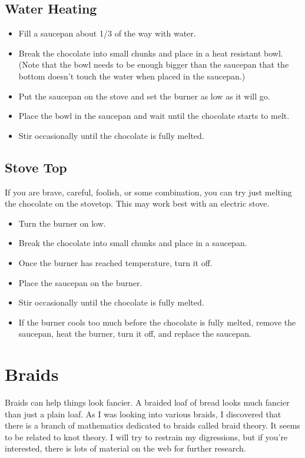 \documentclass[10pt, openany]{book}
\begin{document}
\subsection{Water Heating}
\begin{itemize}
  \item Fill a saucepan about 1/3 of the way with water.
  \item Break the chocolate into small chunks and place in a heat resistant bowl.  (Note that the bowl needs to be enough bigger than the saucepan that the bottom doesn't touch the water when placed in the saucepan.)
  \item Put the saucepan on the stove and set the burner as low as it will go.
  \item Place the bowl in the saucepan and wait until the chocolate starts to melt.
  \item Stir occasionally until the chocolate is fully melted.
\end{itemize}
\subsection{Stove Top}
If you are brave, careful, foolish, or some combination, you can try just melting the chocolate on the stovetop.  This may work best with an electric stove.
\begin{itemize}
  \item Turn the burner on low.
  \item Break the chocolate into small chunks and place in a saucepan.
  \item Once the burner has reached temperature, turn it off.
  \item Place the saucepan on the burner.
  \item Stir occasionally until the chocolate is fully melted.
  \item If the burner cools too much before the chocolate is fully melted, remove the saucepan, heat the burner, turn it off, and replace the saucepan.
\end{itemize}

\section{Braids}
\label{tip:Braid}
Braids can help things look fancier.  A braided loaf of bread looks much fancier than just a plain loaf.  As I was looking into various braids, I discovered that there is a branch of mathematics dedicated to braids called braid theory.  It seems to be related to knot theory.  I will try to restrain my digressions, but if you're interested, there is lots of material on the web for further research.
\end{document}
